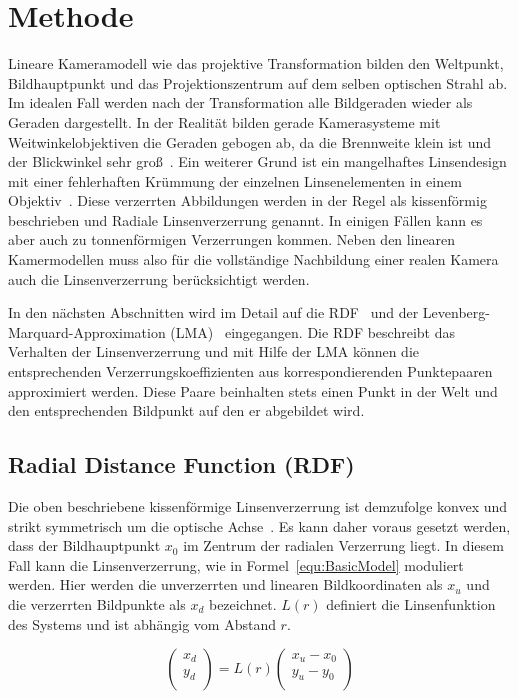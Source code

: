
\section{Methode}
Lineare Kameramodell wie das projektive Transformation bilden den Weltpunkt, Bildhauptpunkt und das Projektionszentrum auf dem selben optischen Strahl ab. Im idealen Fall werden nach der Transformation alle Bildgeraden wieder als Geraden dargestellt. In der Realität bilden gerade Kamerasysteme mit Weitwinkelobjektiven die Geraden gebogen ab, da die Brennweite klein ist und der Blickwinkel sehr groß~\cite{HartleyRadDist}. Ein weiterer Grund ist ein mangelhaftes Linsendesign mit einer fehlerhaften Krümmung der einzelnen Linsenelementen in einem Objektiv~\cite{WengRadDist}\cite{Zhang:1996:EGT:844381.845228}. Diese verzerrten Abbildungen werden in der Regel als kissenförmig beschrieben und Radiale Linsenverzerrung genannt. In einigen Fällen kann es aber auch zu tonnenförmigen Verzerrungen kommen. Neben den linearen Kamermodellen muss also für die vollständige Nachbildung einer realen Kamera auch die Linsenverzerrung berücksichtigt werden. 

In den nächsten Abschnitten wird im Detail auf die RDF~\cite{HartleyRadDist} und der Levenberg-Marquard-Approximation (LMA)~\cite{LevMarquardt} eingegangen. Die RDF beschreibt das Verhalten der Linsenverzerrung und mit Hilfe der LMA können die entsprechenden Verzerrungskoeffizienten aus korrespondierenden Punktepaaren  approximiert werden. Diese Paare beinhalten stets einen Punkt in der Welt und den entsprechenden Bildpunkt auf den er abgebildet wird.

\subsection{Radial Distance Function (RDF)}
Die oben beschriebene kissenförmige Linsenverzerrung ist demzufolge konvex und strikt symmetrisch um die optische Achse~\cite{WengRadDist}. Es kann daher voraus gesetzt werden, dass der Bildhauptpunkt $x_0$ im Zentrum der radialen Verzerrung liegt. In diesem Fall kann die Linsenverzerrung, wie in Formel~\ref{equ:BasicModel} moduliert werden. Hier werden die unverzerrten und linearen Bildkoordinaten als $x_u$ und die verzerrten Bildpunkte als $x_d$ bezeichnet. $L(r)$ definiert die Linsenfunktion des Systems und ist abhängig vom Abstand $r$.

\begin{equation}
\label{equ:BasicModel}
\begin{pmatrix}
x_d \\
y_d\\
\end{pmatrix} =
L(r)
\begin{pmatrix}
x_u-x_0\\
y_u -y_0\\
\end{pmatrix}
\end{equation}

